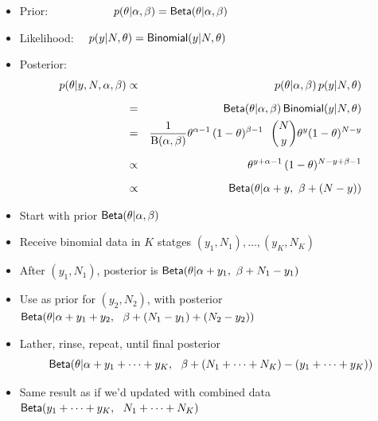 \documentclass[10pt]{report}
\begin{document}
%
\vspace*{-2pt}
\begin{itemize}
\item Prior: \ \ \ \ \ \ \ \ \ \ \ $p(\theta|\alpha,\beta) =
  \text{\sf Beta}(\theta|\alpha,\beta)$
\item Likelihood: \ \ $p(y|N,\theta) = \text{\sf Binomial}(y|N,\theta)$
\item Posterior:
{\small
\begin{eqnarray*}
p(\theta|y,N,\alpha,\beta)
& \propto & p(\theta|\alpha,\beta) \, p(y|N,\theta)
\\[6pt]
& = & \text{\sf Beta}(\theta|\alpha,\beta) 
      \, \text{\sf Binomial}(y|N,\theta)
\\
& = & \frac{1}{{\text B}(\alpha,\beta)} 
      \theta^{\alpha - 1} \, 
      (1 - \theta)^{\beta-1}
      \ \
      \binom{N}{y} \theta^{y} (1 - \theta)^{N-y}
\\[6pt]
& \propto & 
      \theta^{y + \alpha - 1} \, 
      (1 - \theta)^{N - y + \beta - 1}
\\[6pt]
& \propto & \text{\sf Beta}(\theta|\alpha + y, \ \beta + (N - y))
\end{eqnarray*}
}
\end{itemize}


%
\vspace*{-4pt}
\begin{itemize}
\item Start with prior $\text{\sf Beta}(\theta|\alpha,\beta)$
\item Receive binomial data in $K$ statges $(y_1, N_1), \ldots, (y_K, N_K)$
\item After $(y_1,N_1)$, posterior is 
  $\text{\sf Beta}(\theta|\alpha + y_1, \ \beta + N_1 - y_1)$
\item Use as prior for $(y_2,N_2)$, with posterior \\[3pt]
  $\distro{Beta}(\theta|\alpha + y_1 + y_2, \ \ \beta + (N_1 -
  y_1) + (N_2 - y_2))$
\item Lather, rinse, repeat, until final posterior
\[
\text{\sf Beta}(\theta|\alpha + y_1 + \cdots + y_K, \ \ \beta + (N_1 +
\cdots + N_K) - (y_1 + \cdots + y_K))
\]
\item Same result as if we'd updated with combined data \\[3pt]
$\text{\sf Beta}(y_1 + \cdots + y_K, \ \ N_1 + \cdots + N_K)$
\end{itemize}


\end{document}
